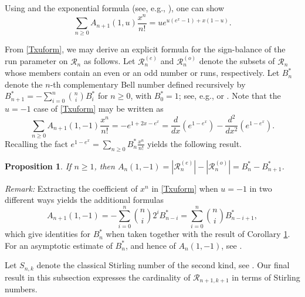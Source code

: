 \documentclass[11pt,a4paper]{article}
\newtheorem{proposition}{Proposition}[section]
\begin{document}
Using \cite[Theorem 19]{NRB} and the exponential formula (see, e.g., \cite[Theorem 6.1.4]{Wag}), one can show
\begin{equation}\label{Txuform}
\sum_{n\geq0}A_{n+1}(1,u)\frac{x^n}{n!}=ue^{u(e^x-1)+x(1-u)}.
\end{equation}

From \eqref{Txuform}, we may derive an explicit formula for the sign-balance of the run parameter on $\mathcal{R}_n$ as follows. Let $\mathcal{R}_n^{(e)}$ and $\mathcal{R}_n^{(o)}$ denote the subsets of $\mathcal{R}_n$ whose members contain an even or an odd number or runs, respectively.  Let $B_n^*$ denote the $n$-th complementary Bell number defined recursively by $B_{n+1}^*=-\sum_{i=0}^n\binom{n}{i}B_i^*$ for $n \geq0$, with $B_0^*=1$; see, e.g., \cite{RUC} or \cite[A000587]{Sl}. Note that the $u=-1$ case of \eqref{Txuform} may be written as
$$\sum_{n\geq0}A_{n+1}(1,-1)\frac{x^n}{n!}=-e^{1+2x-e^x}=\frac{d}{dx}\left(e^{1-e^x}\right)-\frac{d^2}{dx^2}\left(e^{1-e^x}\right).$$
Recalling the fact $e^{1-e^x}=\sum_{n\geq0}B_n^*\frac{x^n}{n!}$ yields the following result.


\begin{proposition}\label{sgnbal}
If $n \geq 1$, then $A_{n}(1,-1)=|\mathcal{R}_{n}^{(e)}|-|\mathcal{R}_{n}^{(o)}|=B_{n}^*-B_{n+1}^*$.
\end{proposition}


\noindent \emph{Remark:} Extracting the coefficient of $x^n$ in \eqref{Txuform} when $u=-1$ in two different ways yields the additional formulas
$$A_{n+1}(1,-1)=-\sum_{i=0}^n\binom{n}{i}2^iB_{n-i}^*=\sum_{i=0}^n\binom{n}{i}B_{n-i+1}^*,$$
which give identities for $B_n^*$ when taken together with the result of Corollary \ref{sgnbal}.  For an asymptotic estimate of $B_n^*$, and hence of $A_{n}(1,-1)$, see \cite[Theorem 1]{Ya}.    \medskip

Let $S_{n,k}$ denote the classical Stirling number of the second kind, see \cite[A008277]{Sl}.  Our final result in this subsection expresses the cardinality of $\mathcal{R}_{n+1,k+1}$ in terms of Stirling numbers.
\end{document}
